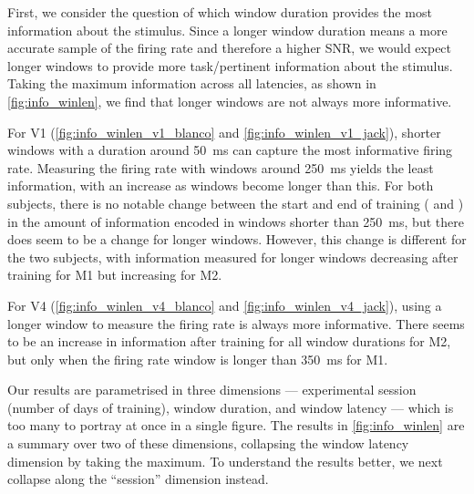 First, we consider the question of which window duration provides the most information about the stimulus.
Since a longer window duration means a more accurate sample of the firing rate and therefore a higher \ac{SNR}, we would expect longer windows to provide more task\-/pertinent information about the stimulus.
Taking the maximum information across all latencies, as shown in \autoref{fig:info_winlen}, we find that longer windows are not always more informative.

For \ac{V1} (\autoref{fig:info_winlen_v1_blanco} and \autoref{fig:info_winlen_v1_jack}), shorter windows with a duration around \SI{50}{\milli\second} can capture the most informative firing rate.
Measuring the firing rate with windows around \SI{250}{\milli\second} yields the least information, with an increase as windows become longer than this.
For both subjects, there is no notable change between the start and end of training ( and ) in the amount of information encoded in windows shorter than \SI{250}{\milli\second}, but there does seem to be a change for longer windows.
However, this change is different for the two subjects, with information measured for longer windows decreasing after training for \ac{M1} but increasing for \ac{M2}.

For \ac{V4} (\autoref{fig:info_winlen_v4_blanco} and \autoref{fig:info_winlen_v4_jack}), using a longer window to measure the firing rate is always more informative.
There seems to be an increase in information after training for all window durations for \ac{M2}, but only when the firing rate window is longer than \SI{350}{\milli\second} for \ac{M1}.

Our results are parametrised in three dimensions --- experimental session (number of days of training), window duration, and window latency --- which is too many to portray at once in a single figure.
The results in \autoref{fig:info_winlen} are a summary over two of these dimensions, collapsing the window latency dimension by taking the maximum.
To understand the results better, we next collapse along the ``session'' dimension instead.

